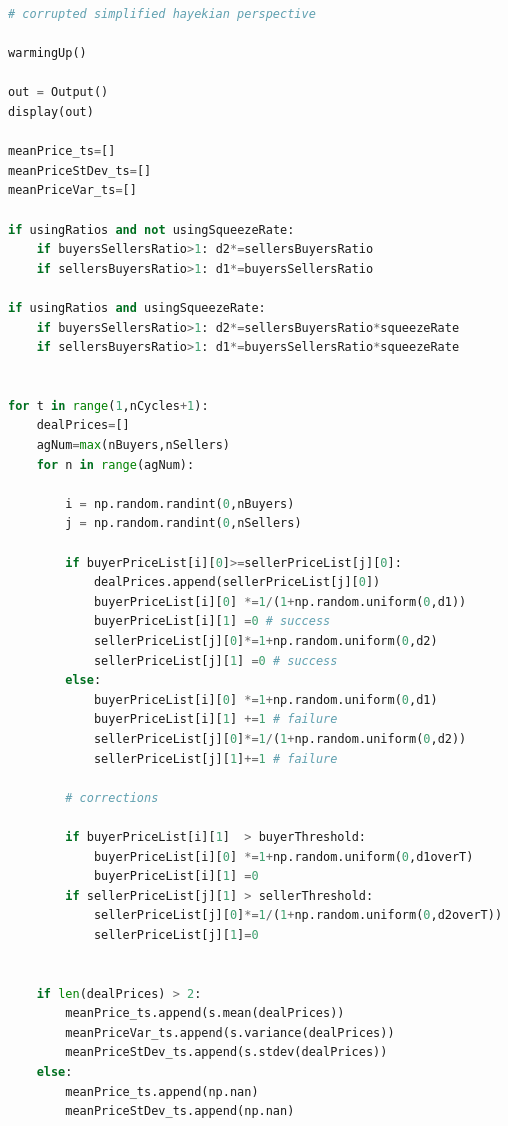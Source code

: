 \documentclass[10pt]{report}
\begin{document}
\begin{appendices}
\begin{lstlisting}[language=Python, caption=The model in the corrupted simplified hayekian perspective, 
label={The listing of model in the corrupted simplified hayekian perspective},basicstyle=\ttfamily\footnotesize]
# corrupted simplified hayekian perspective

warmingUp()

out = Output()
display(out)

meanPrice_ts=[]
meanPriceStDev_ts=[]
meanPriceVar_ts=[]

if usingRatios and not usingSqueezeRate:
    if buyersSellersRatio>1: d2*=sellersBuyersRatio
    if sellersBuyersRatio>1: d1*=buyersSellersRatio
        
if usingRatios and usingSqueezeRate:
    if buyersSellersRatio>1: d2*=sellersBuyersRatio*squeezeRate
    if sellersBuyersRatio>1: d1*=buyersSellersRatio*squeezeRate


for t in range(1,nCycles+1):    
    dealPrices=[]
    agNum=max(nBuyers,nSellers)
    for n in range(agNum):

        i = np.random.randint(0,nBuyers)
        j = np.random.randint(0,nSellers)
        
        if buyerPriceList[i][0]>=sellerPriceList[j][0]:
            dealPrices.append(sellerPriceList[j][0])
            buyerPriceList[i][0] *=1/(1+np.random.uniform(0,d1))
            buyerPriceList[i][1] =0 # success
            sellerPriceList[j][0]*=1+np.random.uniform(0,d2)
            sellerPriceList[j][1] =0 # success
        else:
            buyerPriceList[i][0] *=1+np.random.uniform(0,d1)
            buyerPriceList[i][1] +=1 # failure
            sellerPriceList[j][0]*=1/(1+np.random.uniform(0,d2))
            sellerPriceList[j][1]+=1 # failure
            
        # corrections
        
        if buyerPriceList[i][1]  > buyerThreshold:
            buyerPriceList[i][0] *=1+np.random.uniform(0,d1overT)
            buyerPriceList[i][1] =0
        if sellerPriceList[j][1] > sellerThreshold:
            sellerPriceList[j][0]*=1/(1+np.random.uniform(0,d2overT))
            sellerPriceList[j][1]=0
           
           
    if len(dealPrices) > 2:
        meanPrice_ts.append(s.mean(dealPrices))
        meanPriceVar_ts.append(s.variance(dealPrices))
        meanPriceStDev_ts.append(s.stdev(dealPrices))
    else:
        meanPrice_ts.append(np.nan)
        meanPriceStDev_ts.append(np.nan)
        

\end{lstlisting}
\end{appendices}
\end{document}
